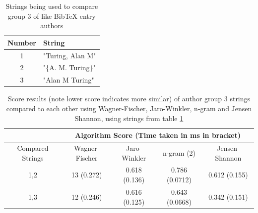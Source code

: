 \documentclass[a4paper,11pt]{article}
\begin{document}
\begin{table}[H]
      \centering
      \begin{tabular}{|c|p{}|}
      \hline
           Number &  String \\ \hline \hline
           1 & "Turing, Alan M" \\ \hline
           2 & "\{A. M. Turing\}" \\ \hline
           3 & "Alan M Turing" \\ \hline
      \end{tabular}
  \caption{Strings being used to compare group 3 of like BibTeX entry authors}
\label{table:authorsGroup3Strings}
\end{table}
    \begin{table}[H]
    \centering
       \begin{tabular}{|c|c|c|c|c|}
    \hline
     & \multicolumn{4}{c|}{Algorithm Score (Time taken in ms in bracket)}\\
     \hline
     Compared Strings  & Wagner-Fischer & Jaro-Winkler & n-gram (2) & Jensen-Shannon \\
     \hline \hline
    1,2 & 13 (0.272) &
0.618 (0.136) &
0.786 (0.0712) &
0.612 (0.155) \\
             \hline
    1,3 & 12 (0.246) &
0.616 (0.125) &
0.643 (0.0668) &
0.342 (0.151) \\
    \hline
    \end{tabular}
    \caption{Score results (note lower score indicates more similar) of author group 3 strings compared to each other using Wagner-Fischer, Jaro-Winkler, n-gram and Jensen Shannon, using strings from table \ref{table:authorsGroup3Strings}}
\label{table:algComparisonResultsAuthor3}
\end{table}
\end{document}
